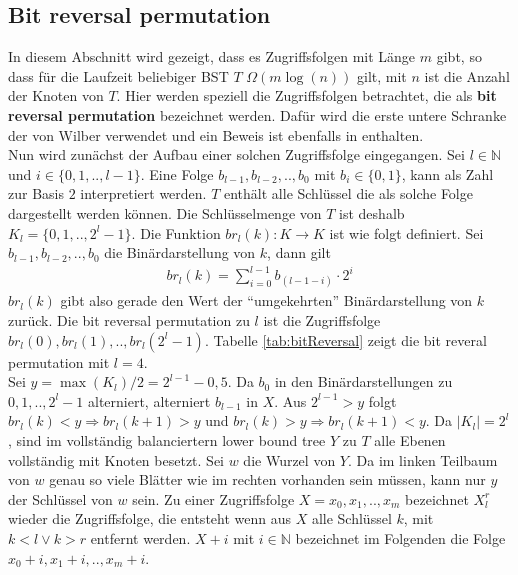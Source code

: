 \documentclass[a4paper,12pt]{article}
\begin{document}
\subsection{Bit reversal permutation } \label{abschnittBitReversal}
In diesem Abschnitt wird gezeigt, dass es Zugriffsfolgen mit Länge $m$ gibt, so dass für die Laufzeit beliebiger BST $T$ $\Omega\left(m \log\left( n\right)\right)$ gilt, mit $n$ ist die Anzahl der Knoten von $T$. Hier werden speziell die Zugriffsfolgen betrachtet, die als \textbf{bit reversal permutation} bezeichnet werden. 
Dafür wird die erste untere Schranke der von Wilber verwendet und ein Beweis ist ebenfalls in \cite{wilberLowerBounds} enthalten. \\
Nun wird zunächst der Aufbau einer solchen Zugriffsfolge eingegangen. Sei $l \in \mathbb{N}$ und $i \in \{0,1,..,l-1\}$. Eine Folge  $b_{l-1},b_{l-2},..,b_0$ mit $b_i \in \{0,1\}$, kann als Zahl zur Basis $2$ interpretiert werden. $T$ enthält alle Schlüssel die als solche Folge dargestellt werden können. Die Schlüsselmenge von $T$ ist deshalb $K_l = \{0,1,..,2^l -1\}$. 
Die Funktion $\mathit{br}_l(k)\colon K \rightarrow K$ ist wie folgt definiert. Sei {$b_{l-1},b_{l-2},..,b_{0}$} die Binärdarstellung von $k$, dann gilt 
\begin{align*}
\mathit{br}_l(k) = \sum_{i = 0}^{l-1} b_{\left(l-1-i\right)} \cdot 2^i
\end{align*}
$\mathit{br}_l(k)$ gibt also gerade den Wert der \enquote{umgekehrten} Binärdarstellung von $k$ zurück. Die bit reversal permutation zu $l$ ist die Zugriffsfolge\\ ${\mathit{br}_l(0),\mathit{br}_l(1),..,\mathit{br}_l(2^l-1)}$. Tabelle \ref{tab:bitReversal} zeigt die bit reveral permutation mit $l  = 4$.\\
 Sei $y = \max\left(K_l\right) /2 = 2^{l-1} - 0,5 $. Da $b_0$ in den Binärdarstellungen zu $0, 1,.., 2^l-1$ alterniert, alterniert $b_{l-1}$ in $X$. Aus $2^{l-1} > y$ folgt \\ $\mathit{br}_l(k) < y \Rightarrow \mathit{br}_l(k +1) > y$ und $\mathit{br}_l(k) > y \Rightarrow \mathit{br}_l(k +1) < y$. Da $\vert K_l \vert = 2^l$, sind im vollständig balanciertern lower bound tree $Y$ zu $T$ alle Ebenen vollständig mit Knoten besetzt. Sei $w$ die Wurzel von $Y$. Da im linken Teilbaum von $w$ genau so viele Blätter wie im rechten vorhanden sein müssen, kann nur $y$ der Schlüssel von $w$ sein. Zu einer Zugriffsfolge $X = x_0,x_1,..,x_m$ bezeichnet $X^r_l$ wieder die Zugriffsfolge, die entsteht wenn aus $X$ alle Schlüssel $k$, mit $k < l \lor k > r$ entfernt werden. $X + i$ mit $i \in \mathbb{N}$ bezeichnet im Folgenden die Folge $x_0 + i, x_1 + i,.., x_m + i$.\\
\end{document}
